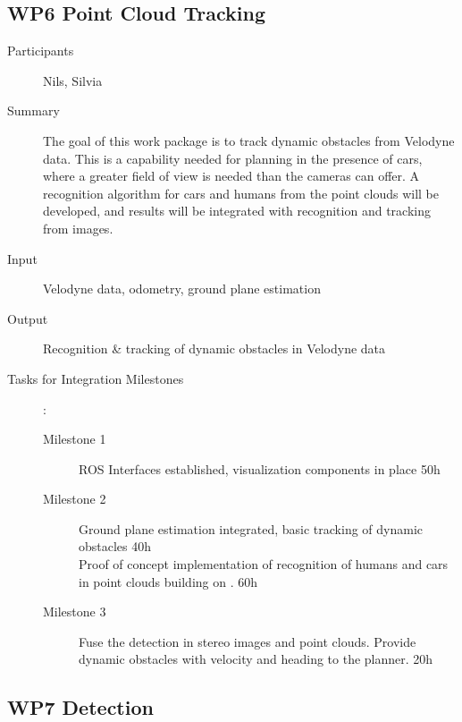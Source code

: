 \documentclass[11pt,a4paper]{article}
\begin{document}
\subsection{WP6 Point Cloud Tracking}

\begin{description}
\item[Participants] Nils, Silvia
\item[Summary] The goal of this work package is to track dynamic obstacles from Velodyne data.
			   This is a capability needed for planning in the presence of cars, where a greater field of view is needed than the cameras can offer.
			   A recognition algorithm for cars and humans from the point clouds will be developed,
			   and results will be integrated with recognition and tracking from images.
\item[Input] Velodyne data, odometry, ground plane estimation
\item[Output] Recognition \& tracking of dynamic obstacles in Velodyne data
\item[Tasks for Integration Milestones]:\
	\begin{description}
		\item[Milestone 1] ROS Interfaces established, visualization components in place 50h
		\item[Milestone 2] Ground plane estimation integrated, basic tracking of dynamic obstacles 40h\\
		
						   Proof of concept implementation of recognition of humans and cars in point clouds building on \cite{wang2015voting}. 60h
		\item[Milestone 3] Fuse the detection in stereo images and point clouds. Provide dynamic obstacles
						   with velocity and heading to the planner. 20h
	\end{description}	 
\end{description}

\subsection{WP7 Detection} %
\end{document}
